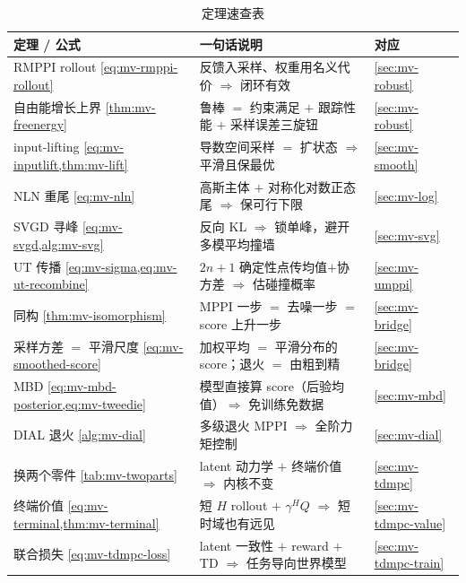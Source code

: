 \begin{table}[H]\centering\small
\caption{定理速查表}
\begin{tabular}{lll}
\toprule
定理 / 公式 & 一句话说明 & 对应 \\
\midrule
RMPPI rollout \cref{eq:mv-rmppi-rollout} & 反馈入采样、权重用名义代价 $\Rightarrow$ 闭环有效 & \cref{sec:mv-robust} \\
自由能增长上界 \cref{thm:mv-freenergy} & 鲁棒 $=$ 约束满足 $+$ 跟踪性能 $+$ 采样误差三旋钮 & \cref{sec:mv-robust} \\
input-lifting \cref{eq:mv-inputlift,thm:mv-lift} & 导数空间采样 $=$ 扩状态 $\Rightarrow$ 平滑且保最优 & \cref{sec:mv-smooth} \\
NLN 重尾 \cref{eq:mv-nln} & 高斯主体 $+$ 对称化对数正态尾 $\Rightarrow$ 保可行下限 & \cref{sec:mv-log} \\
SVGD 寻峰 \cref{eq:mv-svgd,alg:mv-svg} & 反向 KL $\Rightarrow$ 锁单峰，避开多模平均撞墙 & \cref{sec:mv-svg} \\
UT 传播 \cref{eq:mv-sigma,eq:mv-ut-recombine} & $2n{+}1$ 确定性点传均值$+$协方差 $\Rightarrow$ 估碰撞概率 & \cref{sec:mv-umppi} \\
同构 \cref{thm:mv-isomorphism} & MPPI 一步 $=$ 去噪一步 $=$ score 上升一步 & \cref{sec:mv-bridge} \\
采样方差 $=$ 平滑尺度 \cref{eq:mv-smoothed-score} & 加权平均 $=$ 平滑分布的 score；退火 $=$ 由粗到精 & \cref{sec:mv-bridge} \\
MBD \cref{eq:mv-mbd-posterior,eq:mv-tweedie} & 模型直接算 score（后验均值）$\Rightarrow$ 免训练免数据 & \cref{sec:mv-mbd} \\
DIAL 退火 \cref{alg:mv-dial} & 多级退火 MPPI $\Rightarrow$ 全阶力矩控制 & \cref{sec:mv-dial} \\
换两个零件 \cref{tab:mv-twoparts} & latent 动力学 $+$ 终端价值 $\Rightarrow$ 内核不变 & \cref{sec:mv-tdmpc} \\
终端价值 \cref{eq:mv-terminal,thm:mv-terminal} & 短 $H$ rollout $+$ $\gamma^H Q$ $\Rightarrow$ 短时域也有远见 & \cref{sec:mv-tdmpc-value} \\
联合损失 \cref{eq:mv-tdmpc-loss} & latent 一致性 $+$ reward $+$ TD $\Rightarrow$ 任务导向世界模型 & \cref{sec:mv-tdmpc-train} \\
\bottomrule
\end{tabular}
\end{table}

